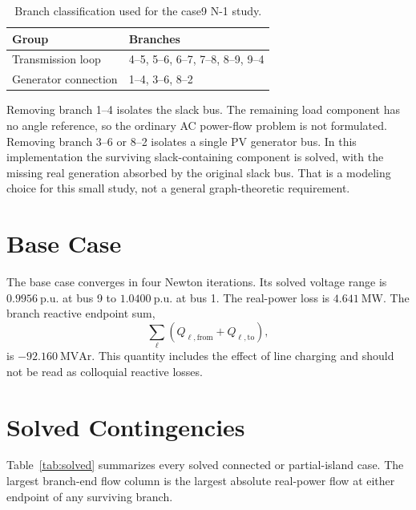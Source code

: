 \documentclass[11pt]{article}
\newcommand{\pu}{\mathrm{p.u.}}
\newcommand{\MW}{\mathrm{MW}}
\newcommand{\MVAr}{\mathrm{MVAr}}
\begin{document}
\begin{table}[htbp]
\centering
\caption{Branch classification used for the case9 N-1 study.}
\label{tab:classification}
\begin{tabular}{@{}ll@{}}
\toprule
Group & Branches \\
\midrule
Transmission loop & 4--5, 5--6, 6--7, 7--8, 8--9, 9--4 \\
Generator connection & 1--4, 3--6, 8--2 \\
\bottomrule
\end{tabular}
\end{table}

Removing branch 1--4 isolates the slack bus. The remaining load component
has no angle reference, so the ordinary AC power-flow problem is not
formulated. Removing branch 3--6 or 8--2 isolates a single PV generator
bus. In this implementation the surviving slack-containing component is
solved, with the missing real generation absorbed by the original slack
bus. That is a modeling choice for this small study, not a general
graph-theoretic requirement.

\section{Base Case}

The base case converges in four Newton iterations. Its solved voltage range
is $0.9956~\pu$ at bus 9 to $1.0400~\pu$ at bus 1. The real-power loss is
$4.641~\MW$. The branch reactive endpoint sum,
\[
  \sum_{\ell} (Q_{\ell,\mathrm{from}} + Q_{\ell,\mathrm{to}}),
\]
is $-92.160~\MVAr$. This quantity includes the effect of line charging and
should not be read as colloquial reactive losses.

\section{Solved Contingencies}

Table~\ref{tab:solved} summarizes every solved connected or partial-island
case. The largest branch-end flow column is the largest absolute real-power
flow at either endpoint of any surviving branch.
\end{document}
